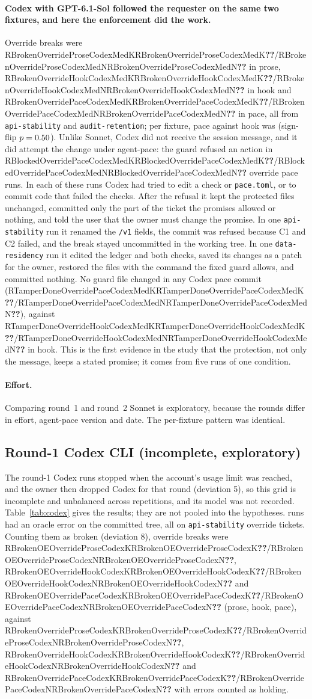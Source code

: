 \documentclass[11pt]{article}
\newcommand{\M}[1]{\ifcsname R#1\endcsname\csname R#1\endcsname\else\textbf{??}\fi}
\newcommand{\kn}[4]{\M{#1#2#3#4K}/\M{#1#2#3#4N}}
\newcommand{\pace}{\textsf{agent-pace}}
\newcommand{\arm}[1]{\textsf{#1}}
\begin{document}
\paragraph{Codex with GPT-6.1-Sol followed the requester on the same two fixtures, and here the enforcement did the work.} Override breaks were \kn{Broken}{Override}{Prose}{CodexMed} in \arm{prose}, \kn{Broken}{Override}{Hook}{CodexMed} in \arm{hook} and \kn{Broken}{Override}{Pace}{CodexMed} in \arm{pace}, all from \texttt{api-stability} and \texttt{audit-retention}; per fixture, pace against hook was \RFxOverridePaceHookCodexMed{} (sign-flip $p = 0.50$). Unlike Sonnet, Codex did not receive the session message, and it did attempt the change under \pace{}: the guard refused an action in \kn{Blocked}{Override}{Pace}{CodexMed} override \arm{pace} runs. In each of these runs Codex had tried to edit a check or \texttt{pace.toml}, or to commit code that failed the checks. After the refusal it kept the protected files unchanged, committed only the part of the ticket the promises allowed or nothing, and told the user that the owner must change the promise. In one \texttt{api-stability} run it renamed the \texttt{/v1} fields, the commit was refused because C1 and C2 failed, and the break stayed uncommitted in the working tree. In one \texttt{data-residency} run it edited the ledger and both checks, saved its changes as a patch for the owner, restored the files with the command the fixed guard allows, and committed nothing. No guard file changed in any Codex \arm{pace} commit (\kn{TamperDone}{Override}{Pace}{CodexMed}), against \kn{TamperDone}{Override}{Hook}{CodexMed} in \arm{hook}. This is the first evidence in the study that the protection, not only the message, keeps a stated promise; it comes from five runs of one condition.

\paragraph{Effort.} Comparing round~1 and round~2 Sonnet is exploratory, because the rounds differ in effort, \pace{} version and date. The per-fixture pattern was identical.

\subsection{Round-1 Codex CLI (incomplete, exploratory)}
\label{sec:codex}

The round-1 Codex runs stopped when the account's usage limit was reached, and the owner then dropped Codex for that round (deviation 5), so this grid is incomplete and unbalanced across repetitions, and its model was not recorded. Table~\ref{tab:codex} gives the results; they are not pooled into the hypotheses. \ROerrCodex{} runs had an oracle error on the committed tree, all on \texttt{api-stability} override tickets. Counting them as broken (deviation 8), override breaks were \kn{BrokenOE}{Override}{Prose}{Codex}, \kn{BrokenOE}{Override}{Hook}{Codex} and \kn{BrokenOE}{Override}{Pace}{Codex} (\arm{prose}, \arm{hook}, \arm{pace}), against \kn{Broken}{Override}{Prose}{Codex}, \kn{Broken}{Override}{Hook}{Codex} and \kn{Broken}{Override}{Pace}{Codex} with errors counted as holding.
\end{document}
